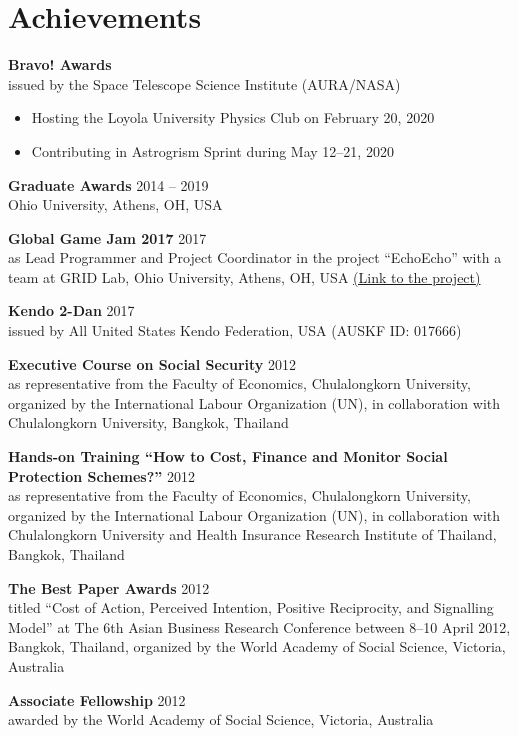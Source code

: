 \documentclass{article}
\begin{document}
\section*{Achievements}

\textbf{Bravo! Awards}\\
issued by the Space Telescope Science Institute (AURA/NASA)
\begin{itemize}
    \item Hosting the Loyola University Physics Club on February 20, 2020
    \item Contributing in Astrogrism Sprint during May 12--21, 2020
\end{itemize}

\textbf{Graduate Awards} \hfill 2014 -- 2019\\
Ohio University, Athens, OH, USA

\textbf{Global Game Jam 2017} \hfill 2017\\
as Lead Programmer and Project Coordinator in the project ``EchoEcho'' with a team at GRID Lab, Ohio University, Athens, OH, USA \href{https://github.com/bkornpob/EchoEcho}{(Link to the project)}

\textbf{Kendo 2-Dan} \hfill 2017\\
issued by All United States Kendo Federation, USA (AUSKF ID: 017666)

\textbf{Executive Course on Social Security} \hfill 2012\\
as representative from the Faculty of Economics, Chulalongkorn University, organized by the International Labour Organization (UN), in collaboration with Chulalongkorn University, Bangkok, Thailand

\textbf{Hands-on Training ``How to Cost, Finance and Monitor Social Protection Schemes?''} \hfill 2012\\
as representative from the Faculty of Economics, Chulalongkorn University, organized by the International Labour Organization (UN), in collaboration with Chulalongkorn University and Health Insurance Research Institute of Thailand, Bangkok, Thailand

\textbf{The Best Paper Awards} \hfill 2012\\
titled ``Cost of Action, Perceived Intention, Positive Reciprocity, and Signalling Model'' at The 6th Asian Business Research Conference between 8--10 April 2012, Bangkok, Thailand, organized by the World Academy of Social Science, Victoria, Australia

\textbf{Associate Fellowship} \hfill 2012\\
awarded by the World Academy of Social Science, Victoria, Australia
\end{document}
